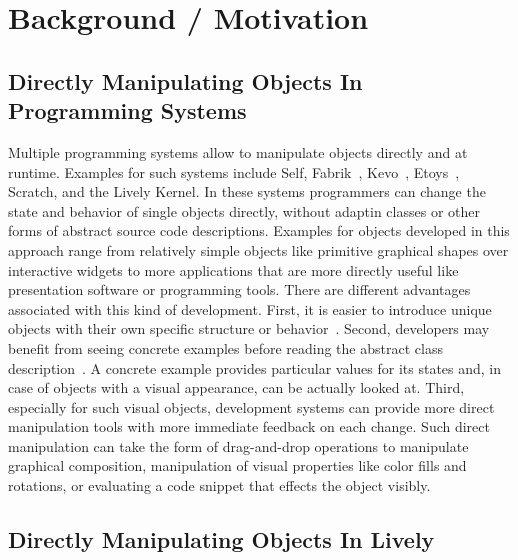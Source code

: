 \chapter{Background / Motivation} \label{sec:BACKGROUND}



\section{Directly Manipulating Objects In Programming Systems}

Multiple programming systems allow to manipulate objects directly and at runtime.
Examples for such systems include Self, Fabrik~\cite{Ingalls1988FVP}, Kevo~\cite{Tailvalsaari1992Kevo}, Etoys~\cite{Kay2005Etoys}, Scratch\cite{Maloney2010SPL}, and the Lively Kernel.
In these systems programmers can change the state and behavior of single objects directly, without adaptin classes or other forms of abstract source code descriptions. 
Examples for objects developed in this approach range from relatively simple objects like primitive graphical shapes over interactive widgets to more applications that are more directly useful like presentation software or programming tools.
There are different advantages associated with this kind of development.
First, it is easier to introduce unique objects with their own specific structure or behavior~. 
Second, developers may benefit from seeing concrete examples before reading the abstract class description~.
A concrete example provides particular values for its states and, in case of objects with a visual appearance, can be actually looked at.
Third, especially for such visual objects, development systems can provide more direct manipulation tools with more immediate feedback on each change.
Such direct manipulation can take the form of drag-and-drop operations to manipulate graphical composition, manipulation of visual properties like color fills and rotations, or evaluating a code snippet that effects the object visibly.




\section{Directly Manipulating Objects In Lively}

